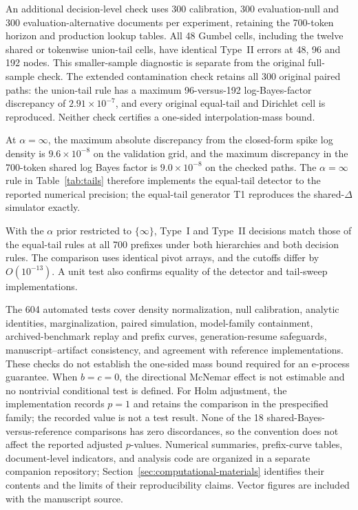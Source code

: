 \documentclass[11pt]{article}
\begin{document}
An additional decision-level check uses 300 calibration, 300 evaluation-null and 300 evaluation-alternative documents per experiment, retaining the 700-token horizon and production lookup tables. All 48 Gumbel cells, including the twelve shared or tokenwise union-tail cells, have identical Type~II errors at 48, 96 and 192 nodes. This smaller-sample diagnostic is separate from the original full-sample check. The extended contamination check retains all 300 original paired paths: the union-tail rule has a maximum 96-versus-192 log-Bayes-factor discrepancy of $2.91\times10^{-7}$, and every original equal-tail and Dirichlet cell is reproduced. Neither check certifies a one-sided interpolation-mass bound.

At $\alpha=\infty$, the maximum absolute discrepancy from the closed-form spike log density is $9.6\times10^{-8}$ on the validation grid, and the maximum discrepancy in the 700-token shared log Bayes factor is $9.0\times10^{-8}$ on the checked paths.  The $\alpha=\infty$ rule in Table~\ref{tab:tails} therefore implements the equal-tail detector to the reported numerical precision; the equal-tail generator T1 reproduces the shared-$\Delta$ simulator exactly.

With the $\alpha$ prior restricted to $\{\infty\}$, Type~I and Type~II decisions match those of the equal-tail rules at all 700 prefixes under both hierarchies and both decision rules.  The comparison uses identical pivot arrays, and the cutoffs differ by $O(10^{-13})$.  A unit test also confirms equality of the detector and tail-sweep implementations.

The 604 automated tests cover density normalization, null calibration, analytic identities, marginalization, paired simulation, model-family containment, archived-benchmark replay and prefix curves, generation-resume safeguards, manuscript--artifact consistency, and agreement with reference implementations.  These checks do not establish the one-sided mass bound required for an e-process guarantee.  When $b=c=0$, the directional McNemar effect is not estimable and no nontrivial conditional test is defined.  For Holm adjustment, the implementation records $p=1$ and retains the comparison in the prespecified family; the recorded value is not a test result.  None of the 18 shared-Bayes-versus-reference comparisons has zero discordances, so the convention does not affect the reported adjusted $p$-values.  Numerical summaries, prefix-curve tables, document-level indicators, and analysis code are organized in a separate companion repository; Section~\ref{sec:computational-materials} identifies their contents and the limits of their reproducibility claims. Vector figures are included with the manuscript source.
\end{document}
